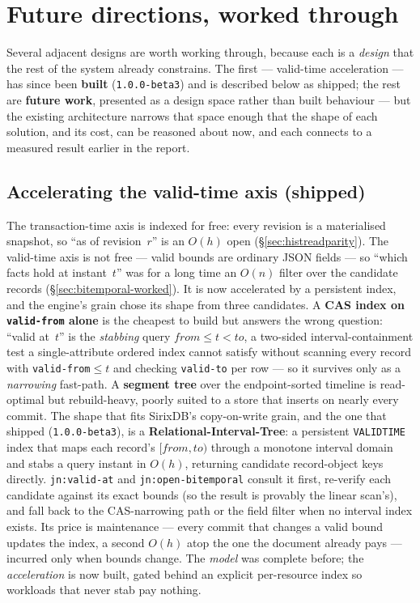 \documentclass[11pt,a4paper,oneside]{report}
\theoremstyle{sirixthm}
\newcommand{\code}[1]{\texttt{#1}}
\begin{document}
\section{Future directions, worked through}
\label{sec:futuredirections}

Several adjacent designs are worth working through, because each is a \emph{design} that the rest of the
system already constrains. The first --- valid-time acceleration --- has since been \textbf{built}
(\code{1.0.0-beta3}) and is described below as shipped; the rest are \textbf{future work}, presented as a
design space rather than built behaviour --- but the existing architecture narrows that space enough that
the shape of each solution, and its cost, can be reasoned about now, and each connects to a measured
result earlier in the report.

\subsection*{Accelerating the valid-time axis (shipped)}

The transaction-time axis is indexed for free: every revision is a materialised snapshot, so ``as of
revision~$r$'' is an $O(h)$ open (\S\ref{sec:histreadparity}). The valid-time axis is not free --- valid
bounds are ordinary JSON fields --- so ``which facts hold at instant~$t$'' was for a long time an $O(n)$
filter over the candidate records (\S\ref{sec:bitemporal-worked}). It is now accelerated by a persistent
index, and the engine's grain chose its shape from three candidates. A \textbf{CAS index on
\code{valid-from} alone} is the cheapest to build but answers the wrong question: ``valid at~$t$'' is the
\emph{stabbing} query $\textit{from}\le t<\textit{to}$, a two-sided interval-containment test a
single-attribute ordered index cannot satisfy without scanning every record with \code{valid-from}$\le t$
and checking \code{valid-to} per row --- so it survives only as a \emph{narrowing} fast-path. A
\textbf{segment tree} over the endpoint-sorted timeline is read-optimal but rebuild-heavy, poorly suited to
a store that inserts on nearly every commit. The shape that fits SirixDB's copy-on-write grain, and the one
that shipped (\code{1.0.0-beta3}), is a \textbf{Relational-Interval-Tree}: a persistent \code{VALIDTIME}
index that maps each record's $[\textit{from},\textit{to})$ through a monotone interval domain and stabs a
query instant in $O(h)$, returning candidate record-object keys directly. \code{jn:valid-at} and
\code{jn:open-bitemporal} consult it first, re-verify each candidate against its exact bounds (so the
result is provably the linear scan's), and fall back to the CAS-narrowing path or the field filter when no
interval index exists. Its price is maintenance --- every commit that changes a valid bound updates the
index, a second $O(h)$ atop the one the document already pays --- incurred only when bounds change. The
\emph{model} was complete before; the \emph{acceleration} is now built, gated behind an explicit
per-resource index so workloads that never stab pay nothing.
\end{document}
